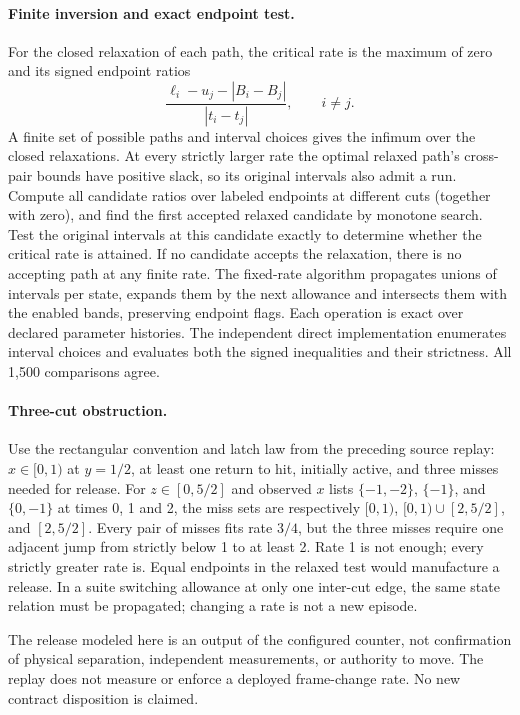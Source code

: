 \documentclass[11pt]{article}
\begin{document}
\paragraph{Finite inversion and exact endpoint test.}
For the closed relaxation of each path, the critical rate is the
maximum of zero and its signed endpoint ratios
\[
  \frac{\ell_i-u_j-|B_i-B_j|}{|t_i-t_j|},\qquad i\ne j .
\]
A finite set of possible paths and interval choices gives the
infimum over the closed relaxations. At every strictly larger rate
the optimal relaxed path's cross-pair bounds have positive slack,
so its original intervals also admit a run.
Compute all candidate ratios over labeled endpoints at different cuts
(together with zero), and find the first accepted relaxed candidate
by monotone search. Test the original intervals at this candidate
exactly to determine whether the critical rate is attained. If no
candidate accepts the relaxation, there is no accepting path at any
finite rate. The fixed-rate algorithm propagates unions of intervals
per state, expands them by the next allowance and intersects them
with the enabled bands, preserving endpoint flags. Each operation is
exact over declared parameter histories. The independent direct
implementation enumerates interval choices and evaluates both
the signed inequalities and their strictness. All 1{,}500 comparisons
agree.

\paragraph{Three-cut obstruction.}
Use the rectangular convention and latch law from the preceding
source replay: $x\in[0,1)$ at $y=1/2$, at least one return to hit,
initially active, and three misses needed for release. For
$z\in[0,5/2]$ and observed $x$ lists $\{-1,-2\}$, $\{-1\}$,
and $\{0,-1\}$ at times 0, 1 and 2, the miss sets are respectively
$[0,1)$, $[0,1)\cup[2,5/2]$, and $[2,5/2]$.
Every pair of misses fits rate $3/4$, but the three misses require
one adjacent jump from strictly below 1 to at least 2. Rate 1
is not enough; every strictly greater rate is. Equal endpoints in
the relaxed test would manufacture a release. In a suite switching
allowance at only one inter-cut edge, the same state relation must
be propagated; changing a rate is not a new episode.

The release modeled here is an output of the configured counter,
not confirmation of physical separation, independent measurements,
or authority to move. The replay does not measure or enforce a
deployed frame-change rate. No new contract disposition is claimed.
\end{document}
